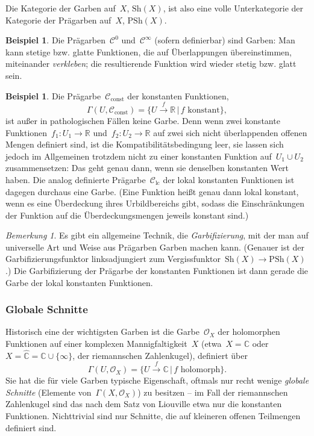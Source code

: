 \documentclass[a4paper,ngerman,12pt]{scrartcl}
\theoremstyle{definition}
\newtheorem{bsp}[defn]{Beispiel}
\theoremstyle{plain}
\theoremstyle{remark}
\newtheorem{bem}[defn]{Bemerkung}
\newcommand{\xra}[1]{\xrightarrow{#1}}
\newcommand{\RR}{\mathbb{R}}
\newcommand{\CC}{\mathbb{C}}
\newcommand{\C}{\mathcal{C}}
\renewcommand{\O}{\mathcal{O}}
\newcommand{\Sh}{\mathrm{Sh}}
\newcommand{\PSh}{\mathrm{PSh}}
\renewcommand{\_}{\mathpunct{.}\,}
\newcommand{\?}{\,{:}\,}
\begin{document}
Die Kategorie der Garben auf~$X$, $\Sh(X)$, ist also eine volle Unterkategorie
der Kategorie der Prägarben auf~$X$, $\PSh(X)$.

\begin{bsp}Die Prägarben~$\C^0$ und~$\C^\infty$ (sofern definierbar) sind
Garben: Man kann stetige bzw. glatte Funktionen, die auf Überlappungen
übereinstimmen, miteinander \emph{verkleben}; die resultierende Funktion wird
wieder stetig bzw. glatt sein.\end{bsp}

\begin{bsp}Die Prägarbe~$\C_{\text{const}}$ der konstanten Funktionen,
\[ \Gamma(U, \C_{\text{const}}) = \{ U \xra{f} \RR \,|\, \text{$f$ konstant}
\}, \]
ist außer in pathologischen Fällen keine Garbe. Denn wenn zwei konstante
Funktionen~$f_1 : U_1 \to \RR$ und~$f_2 : U_2 \to \RR$ auf zwei sich nicht
überlappenden offenen Mengen definiert sind, ist die Kompatibilitätsbedingung
leer, sie lassen sich jedoch im Allgemeinen trotzdem nicht zu einer konstanten Funktion
auf~$U_1 \cup U_2$ zusammensetzen: Das geht genau dann, wenn sie denselben
konstanten Wert haben. Die analog definierte Prägarbe~$\C_{\text{lc}}$ der
lokal konstanten Funktionen ist dagegen durchaus eine Garbe. (Eine Funktion heißt genau
dann lokal konstant, wenn es eine Überdeckung ihres Urbildbereichs gibt, sodass
die Einschränkungen der Funktion auf die Überdeckungsmengen jeweils konstant
sind.)\end{bsp}

\begin{bem}Es gibt ein allgemeine Technik, die \emph{Garbifizierung}, mit der
man auf universelle Art und Weise aus Prägarben Garben machen kann. (Genauer
ist der Garbifizierungsfunktor linksadjungiert zum Vergissfunktor~$\Sh(X) \to
\PSh(X)$.) Die Garbifizierung der Prägarbe der konstanten Funktionen ist dann
gerade die Garbe der lokal konstanten Funktionen.\end{bem}


\subsubsection*{Globale Schnitte}

Historisch eine der wichtigsten Garben ist die Garbe~$\O_X$ der holomorphen
Funktionen auf einer komplexen Mannigfaltigkeit~$X$ (etwa~$X = \CC$ oder~$X =
\widehat{\CC} = \CC \cup \{ \infty \}$, der riemannschen Zahlenkugel), definiert
über
\[ \Gamma(U, \O_X) = \{ U \xra{f} \CC \,|\, \text{$f$ holomorph} \}. \]
Sie hat die für viele Garben typische Eigenschaft, oftmals nur recht wenige
\emph{globale Schnitte} (Elemente von~$\Gamma(X,\O_X)$) zu besitzen -- im Fall
der riemannschen Zahlenkugel sind das nach dem Satz von Liouville etwa nur
die konstanten Funktionen. Nichttrivial sind nur Schnitte, die auf
kleineren offenen Teilmengen definiert sind.
\end{document}
